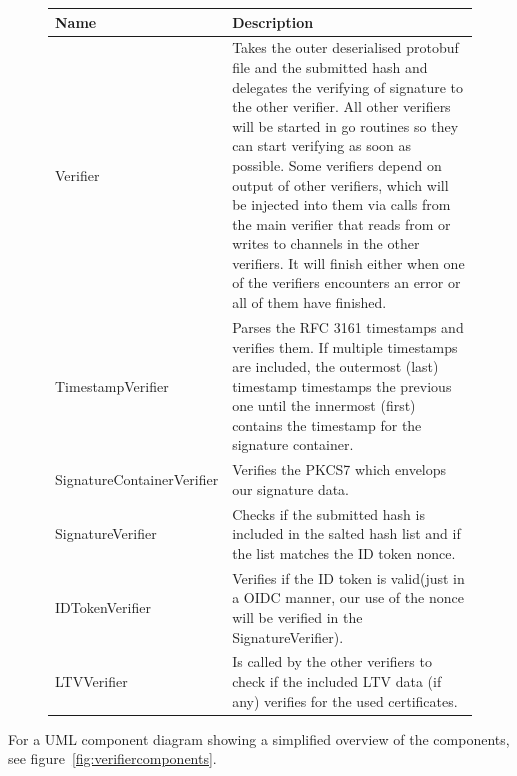 \begin{figure}[H]
	\begin{center}
		\begin{tabular}{p{4.2cm}|p{12cm}}
			\textbf{Name} & \textbf{Description}
			\\ \hline
			Verifier &
			Takes the outer deserialised protobuf file and the submitted hash and delegates the verifying of signature to the other verifier.
			All other verifiers will be started in go routines so they can start verifying as soon as possible.
			Some verifiers depend on output of other verifiers, which will be injected into them via calls from the main verifier that reads from or writes to channels in the other verifiers.
			It will finish either when one of the verifiers encounters an error or all of them have finished.
			\\ \hline
			TimestampVerifier &
			Parses the \gls{RFC} 3161 timestamps and verifies them.
			If multiple timestamps are included, the outermost (last) timestamp timestamps the previous one until the innermost (first) contains the timestamp for the signature container.
			\\ \hline
			SignatureContainerVerifier &
			Verifies the \gls{PKCS7} which envelops our signature data.
			\\ \hline
			SignatureVerifier &
			Checks if the submitted hash is included in the salted hash list and if the list matches the ID token nonce.
			\\ \hline
			IDTokenVerifier &
			Verifies if the ID token is valid(just in a OIDC manner, our use of the nonce will be verified in the SignatureVerifier).
			\\ \hline
			LTVVerifier &
			Is called by the other verifiers to check if the included \gls{LTV} data (if any) verifies for the used certificates.
		\end{tabular}
	\end{center}
\end{figure}

For a \gls{UML} component diagram showing a simplified overview of the components, see figure~\ref{fig:verifiercomponents}.

